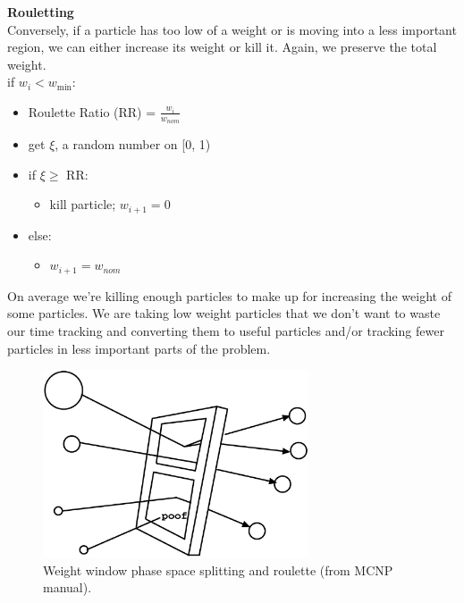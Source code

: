 \documentclass[12pt]{article}
\begin{document}
\textbf{Rouletting}\\
Conversely, if a particle has too low of a weight or is moving into a less important region, we can either increase its weight or kill it. Again, we preserve the total weight.\\
\noindent\makebox[\linewidth]{\rule{\textwidth}{0.4pt}}
if $w_i < w_{\min}$:
\begin{itemize}
\item Roulette Ratio (RR) = $\frac{w_i}{w_{nom}}$
\item get $\xi$, a random number on [0, 1)
\item if $\xi \geq$ RR:
  \begin{itemize}
  \item kill particle; $w_{i+1} = 0$
  \end{itemize}
\item else:
  \begin{itemize}
  \item $w_{i+1} = w_{nom}$
  \end{itemize}
\end{itemize}
\noindent\makebox[\linewidth]{\rule{\textwidth}{0.4pt}}
%
On average we're killing enough particles to make up for increasing the weight of some particles. We are taking low weight particles that we don't want to waste our time tracking and converting them to useful particles and/or tracking fewer particles in less important parts of the problem.

\begin{figure}[!htb]
\centering
\includegraphics[width=0.7\textwidth]{fig/ww-mcnp.eps}
\caption{Weight window phase space splitting and roulette (from MCNP manual).}
\label{fig:ww}
\end{figure}
\end{document}
